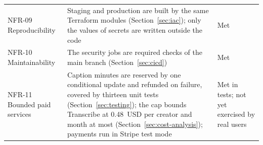 \begin{table}[H]
\begin{tabularx}{\textwidth}{>{\raggedright\arraybackslash}p{} >{\raggedright\arraybackslash}X >{\raggedright\arraybackslash}p{}}
NFR-09 Reproducibility & Staging and production are built by the same Terraform modules (Section~\ref{sec:iac}); only the values of secrets are written outside the code & Met \\
NFR-10 Maintainability & The security jobs are required checks of the main branch (Section~\ref{sec:cicd}) & Met \\
NFR-11 Bounded paid services & Caption minutes are reserved by one conditional update and refunded on failure, covered by thirteen unit tests (Section~\ref{sec:testing}); the cap bounds Transcribe at 0.48~USD per creator and month at most (Section~\ref{sec:cost-analysis}); payments run in Stripe test mode & Met in tests; not yet exercised by real users \\
\bottomrule
\end{tabularx}
\end{table}
